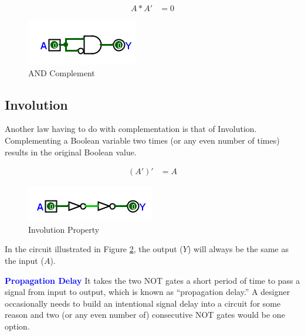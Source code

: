 \begin{align}
  \label{BF:eq:complement_and}
  A * A' &= 0
\end{align}

\begin{figure}[H]
	\centering
	\includegraphics[width=\maxwidth{.95\linewidth}]{gfx/04_17}
	\caption{AND Complement}
	\label{fig:04_17}
\end{figure}

\subsection{Involution}
\label{BF:subsec:involution}


Another law having to do with complementation is that of Involution. Complementing a Boolean variable two times (or any even number of times) results in the original Boolean value. 

\begin{align}
  \label{BF:eq:involuton}
  (A')' &= A
\end{align}

\begin{figure}[H]
	\centering
	\includegraphics[width=\maxwidth{.95\linewidth}]{gfx/04_18}
	\caption{Involution Property}
	\label{fig:04_18}
\end{figure}

In the circuit illustrated in Figure \ref{fig:04_18}, the output ($ Y $) will always be the same as the input ($ A $). 

\begin{tcolorbox}[colback=blue!5!white,colframe=blue!75!black]
  \textcolor{blue}{\textbf{Propagation Delay}}
  \tcblower
  It takes the two \textsf{NOT} gates a short period of time to pass a signal from input to output, which is known as ``propagation delay.'' A designer occasionally needs to build an intentional signal delay into a circuit for some reason and two (or any even number of) consecutive \textsf{NOT} gates would be one option.
\end{tcolorbox}

